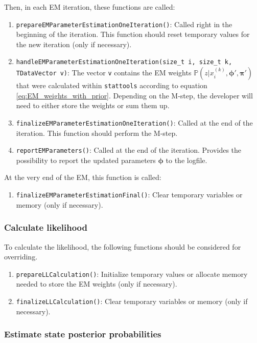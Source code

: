 \documentclass[a4paper,11pt]{article}
\def\bpi{\boldsymbol{\pi}}
\def\bphi{\boldsymbol{\phi}}
\def\p{\mathbb{P}}
\def\stattools{\texttt{stattools}}
\newcommand{\func}[1]{\texttt{#1}}
\newcommand{\pubfunc}[1]{\texttt{#1()}}
\newcommand{\variable}[1]{\texttt{#1}}
\begin{document}
Then, in each EM iteration, these functions are called:
\begin{enumerate}
 \item \pubfunc{prepareEMParameterEstimationOneIteration}: Called right in the beginning of the iteration. This function should reset temporary values for the new iteration (only if necessary).
 \item \func{handleEMParameterEstimationOneIteration(size\_t i, size\_t k, TDataVector v)}: The vector \variable{v} contains the EM weights $\p(z | x_i^{(k)}, \bphi', \bpi')$ that were calculated within \stattools{} according to equation \eqref{eq:EM_weights_with_prior}. Depending on the M-step, the developer will need to either store the weights or sum them up.
 \item \pubfunc{finalizeEMParameterEstimationOneIteration}: Called at the end of the iteration. This function should perform the M-step.
 \item \pubfunc{reportEMParameters}: Called at the end of the iteration. Provides the possibility to report the updated parameters $\bphi$ to the logfile.
\end{enumerate}

At the very end of the EM, this function is called:
\begin{enumerate}
 \item \pubfunc{finalizeEMParameterEstimationFinal}: Clear temporary variables or memory (only if necessary).
\end{enumerate}

\subsubsection{Calculate likelihood}

To calculate the likelihood, the following functions should be considered for overriding.

\begin{enumerate}
 \item \pubfunc{prepareLLCalculation}: Initialize temporary values or allocate memory needed to store the EM weights (only if necessary).
 \item \pubfunc{finalizeLLCalculation}: Clear temporary variables or memory (only if necessary).
\end{enumerate}

\subsubsection{Estimate state posterior probabilities}
\end{document}
